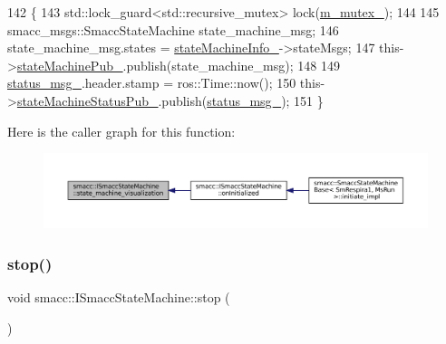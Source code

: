 \begin{DoxyCode}
142 \{
143     std::lock\_guard<std::recursive\_mutex> lock(\hyperlink{classsmacc_1_1ISmaccStateMachine_aac785541646e5c517273bf31072505a1}{m\_mutex\_});
144 
145     smacc\_msgs::SmaccStateMachine state\_machine\_msg;
146     state\_machine\_msg.states = \hyperlink{classsmacc_1_1ISmaccStateMachine_a0914aa27c3f51374c338d89a32b135d1}{stateMachineInfo\_}->stateMsgs;
147     this->\hyperlink{classsmacc_1_1ISmaccStateMachine_af4aa9fed70bd4c57b19e3370fbd25de7}{stateMachinePub\_}.publish(state\_machine\_msg);
148 
149     \hyperlink{classsmacc_1_1ISmaccStateMachine_a4f47dd614f12a95e7a3c46d465ce4b13}{status\_msg\_}.header.stamp = ros::Time::now();
150     this->\hyperlink{classsmacc_1_1ISmaccStateMachine_a55a7c7b26ad4dfea441c62c6326a5414}{stateMachineStatusPub\_}.publish(\hyperlink{classsmacc_1_1ISmaccStateMachine_a4f47dd614f12a95e7a3c46d465ce4b13}{status\_msg\_});
151 \}
\end{DoxyCode}
Here is the caller graph for this function\+:
\nopagebreak
\begin{figure}[H]
\begin{center}
\leavevmode
\includegraphics[width=350pt]{classsmacc_1_1ISmaccStateMachine_ac03029f770422d0ea77ea9856b8cb1a8_icgraph}
\end{center}
\end{figure}
\mbox{\label{classsmacc_1_1ISmaccStateMachine_adcb1b55e014f982a713a863ffb0261d3}} 
\subsubsection{\texorpdfstring{stop()}{stop()}}
{\footnotesize\ttfamily void smacc\+::\+I\+Smacc\+State\+Machine\+::stop (\begin{DoxyParamCaption}{ }\end{DoxyParamCaption})\hspace{0.3cm}{\ttfamily [virtual]}}



